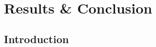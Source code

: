 \chapter{Results \& Conclusion }
\label{ch:chapter08}
 
%
%
\section{Introduction}
\label{sec:chapter08:intro}


